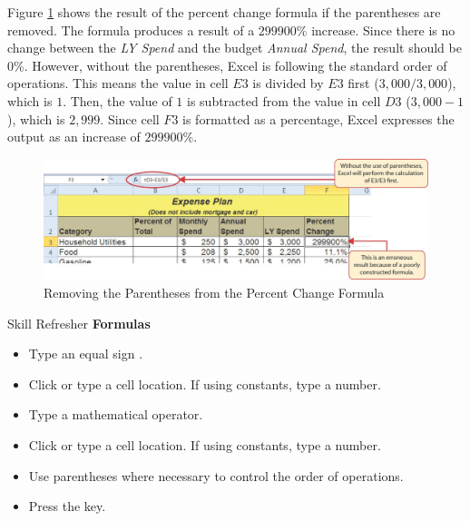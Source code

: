 Figure \ref{02:fig07} shows the result of the percent change formula if the parentheses are removed. The formula produces a result of a $ 299900\% $ increase. Since there is no change between the \textit{LY Spend} and the budget \textit{Annual Spend}, the result should be 0\%. However, without the parentheses, Excel is following the standard order of operations. This means the value in cell $ E3 $ is divided by $ E3 $ first ($ 3,000 / 3,000 $), which is $ 1 $. Then, the value of $ 1 $ is subtracted from the value in cell $ D3 $ ($ 3,000 - 1 $), which is $ 2,999 $. Since cell $ F3 $ is formatted as a percentage, Excel expresses the output as an increase of $ 299900\% $.

\begin{figure}[H]
	\centering
	\includegraphics[width=\maxwidth{.95\linewidth}]{gfx/ch02_fig07}
	\caption{Removing the Parentheses from the Percent Change Formula}
	\label{02:fig07}
\end{figure}

\begin{center}
	\begin{sklbox}{Skill Refresher}
		\textbf{Formulas}
		\\
		\begin{itemize}
			\setlength{\itemsep}{0pt}
			\setlength{\parskip}{0pt}
			\setlength{\parsep}{0pt}
			
			\item Type an equal sign \fmtTyping{=}.
			\item Click or type a cell location. If using constants, type a number.
			\item Type a mathematical operator.
			\item Click or type a cell location. If using constants, type a number.
			\item Use parentheses where necessary to control the order of operations.
			\item Press the  key.

		\end{itemize}
	\end{sklbox}
\end{center}

